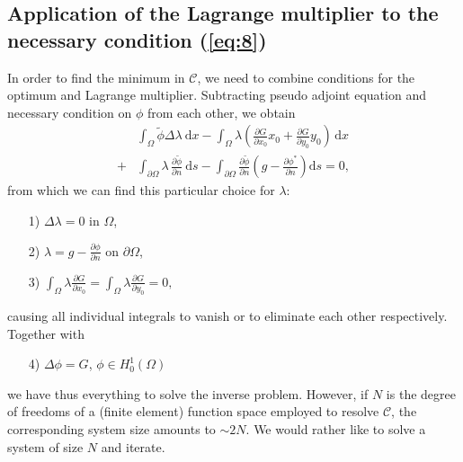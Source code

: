 \subsection{Application of the Lagrange multiplier to the necessary condition (\ref{eq:8})}
In order to find the minimum in $\mathcal{C}$, we need to combine conditions for the optimum and Lagrange multiplier. 
Subtracting pseudo adjoint equation and necessary condition on $\phi$ from each other, we obtain
\begin{align}\label{eq:13}
	&\int_\Omega \widetilde{\phi} \Delta\lambda \:\mathrm{d}x
	-\int_\Omega\lambda \left( 
	\frac{\partial G}{\partial x_0}x_0+\frac{\partial G}{\partial y_0}y_0
	\right)\,\mathrm{d}x\\
	+&\int_{\partial \Omega} \lambda \,\frac{\partial\widetilde{\phi}}{\partial n}\:\mathrm{d}s
	-\int_{\partial\Omega} \frac{\partial\widetilde{\phi}}{\partial n} 
		\left(g-\frac{\partial\phi^*}{\partial n}\right) \mathrm{d}s
	= 0,\nonumber
\end{align}
from which we can find this particular choice for $\lambda$:
\begin{itemize}
	\item[1)] $\Delta\lambda=0$ in $\Omega$,
	\item[2)] $\lambda=g-\frac{\partial\phi}{\partial n}$ on $\partial\Omega$,
	\item[3)] $\int_{\Omega}\lambda\frac{\partial G}{\partial x_0}
			  =\int_{\Omega}\lambda\frac{\partial G}{\partial y_0} = 0,$
\end{itemize}
causing all individual integrals to vanish or to eliminate each other respectively.
Together with 
\begin{itemize}
	\item[4)] $\Delta\phi=G$, $\phi\in H^1_0(\Omega)$
\end{itemize}
we have thus everything to solve the inverse problem. However, if $N$ is the degree of freedoms of a (finite element) function space employed to resolve $\mathcal{C}$, the corresponding system size amounts to $\sim 2N$. We would rather like to solve a system of size $N$ and iterate. 

